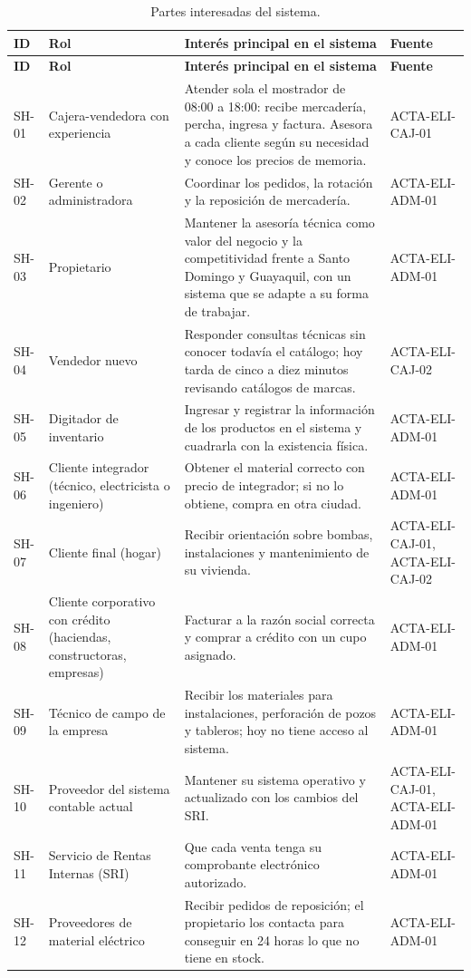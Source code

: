 \small
\begin{longtable}{@{}L{1.2cm}L{3.0cm}L{6.4cm}L{2.6cm}@{}}
\caption{Partes interesadas del sistema.}\label{tab:stakeholders}\\
\toprule
\textbf{ID} & \textbf{Rol} & \textbf{Interés principal en el sistema} & \textbf{Fuente} \\
\midrule
\endfirsthead
\toprule
\textbf{ID} & \textbf{Rol} & \textbf{Interés principal en el sistema} & \textbf{Fuente} \\
\midrule
\endhead
\bottomrule
\endfoot
SH-01 & Cajera-vendedora con experiencia & Atender sola el mostrador de 08:00 a 18:00: recibe mercadería, percha, ingresa y factura. Asesora a cada cliente según su necesidad y conoce los precios de memoria. & ACTA-ELI-CAJ-01 \\
SH-02 & Gerente o administradora & Coordinar los pedidos, la rotación y la reposición de mercadería. & ACTA-ELI-ADM-01 \\
SH-03 & Propietario & Mantener la asesoría técnica como valor del negocio y la competitividad frente a Santo Domingo y Guayaquil, con un sistema que se adapte a su forma de trabajar. & ACTA-ELI-ADM-01 \\
SH-04 & Vendedor nuevo & Responder consultas técnicas sin conocer todavía el catálogo; hoy tarda de cinco a diez minutos revisando catálogos de marcas. & ACTA-ELI-CAJ-02 \\
SH-05 & Digitador de inventario & Ingresar y registrar la información de los productos en el sistema y cuadrarla con la existencia física. & ACTA-ELI-ADM-01 \\
SH-06 & Cliente integrador (técnico, electricista o ingeniero) & Obtener el material correcto con precio de integrador; si no lo obtiene, compra en otra ciudad. & ACTA-ELI-ADM-01 \\
SH-07 & Cliente final (hogar) & Recibir orientación sobre bombas, instalaciones y mantenimiento de su vivienda. & ACTA-ELI-CAJ-01, ACTA-ELI-CAJ-02 \\
SH-08 & Cliente corporativo con crédito (haciendas, constructoras, empresas) & Facturar a la razón social correcta y comprar a crédito con un cupo asignado. & ACTA-ELI-ADM-01 \\
SH-09 & Técnico de campo de la empresa & Recibir los materiales para instalaciones, perforación de pozos y tableros; hoy no tiene acceso al sistema. & ACTA-ELI-ADM-01 \\
SH-10 & Proveedor del sistema contable actual & Mantener su sistema operativo y actualizado con los cambios del SRI. & ACTA-ELI-CAJ-01, ACTA-ELI-ADM-01 \\
SH-11 & Servicio de Rentas Internas (SRI) & Que cada venta tenga su comprobante electrónico autorizado. & ACTA-ELI-ADM-01 \\
SH-12 & Proveedores de material eléctrico & Recibir pedidos de reposición; el propietario los contacta para conseguir en 24 horas lo que no tiene en stock. & ACTA-ELI-ADM-01 \\
\end{longtable}
\normalsize

